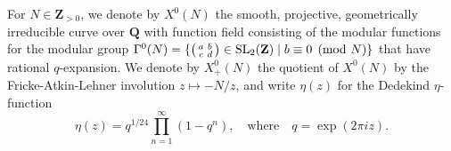 \documentclass{amsart}
\newcommand{\QQ}{\mathbf{Q}}
\newcommand{\ZZ}{\mathbf{Z}}
\newcommand{\xnul}[1]{X^0(#1)}
\newcommand{\xnulN}{\xnul{N}}
\newcommand{\xplus}[1]{X^0_+(#1)}
\newcommand{\xplusN}{\xplus{N}}
\DeclareMathOperator{\SL}{SL}
\numberwithin{equation}{section}
\theoremstyle{definition}
\begin{document}
For $N\in\ZZ_{>0}$, we denote by $\xnulN$ the smooth,
projective, geometrically irreducible curve over $\QQ$ with function field consisting of the modular functions for the modular group
$\Gamma^0(N)=\{\begin{psmallmatrix}
a & b\\
c & d
\end{psmallmatrix} \in \SL_2(\ZZ)\mid b\equiv 0 \pmod{N}\}$
that have rational $q$-expansion.
We denote by $\xplusN$ the quotient of $\xnulN$ by the
Fricke-Atkin-Lehner involution
$z\mapsto -N/z$, %
and write $\eta(z)$ for the Dedekind $\eta$-function
\begin{equation*}
\eta(z) = q^{1/24}\prod_{n=1}^{\infty}(1-q^n),
\quad\mbox{where}\quad
q = \exp(2\pi i z).
\end{equation*}
\end{document}
